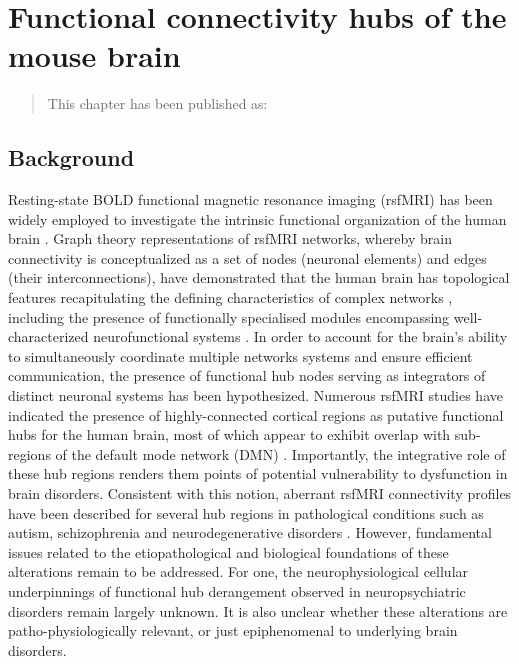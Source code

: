 \chapter{Functional connectivity hubs of the mouse brain}

\label{Chapter02}

\begin{quote}
    This chapter has been published as:

\end{quote}

\section{Background} 
Resting-state BOLD functional magnetic resonance imaging (rsfMRI) has been
widely employed to investigate the intrinsic functional organization of the
human brain \parencite{bullmore2009}. Graph theory representations of rsfMRI
networks, whereby brain connectivity is conceptualized as a set of nodes
(neuronal elements) and edges (their interconnections), have demonstrated that
the human brain has topological features recapitulating the defining
characteristics of complex networks \parencite{watts1998}, including the
presence of functionally specialised modules encompassing well-characterized
neurofunctional systems \parencite{fair2009, meunier2009, power2011}. In order
to account for the brain’s ability to simultaneously coordinate multiple
networks systems and ensure efficient communication, the presence of functional
hub nodes serving as integrators of distinct neuronal systems has been
hypothesized. Numerous rsfMRI studies have indicated the presence of
highly-connected cortical regions as putative functional hubs for the human
brain, most of which appear to exhibit overlap with sub-regions of the default
mode network (DMN) \parencite{cole2010, tomasi2011, zuo2012}. Importantly, the
integrative role of these hub regions renders them points of potential
vulnerability to dysfunction in brain disorders. Consistent with this notion,
aberrant rsfMRI connectivity profiles have been described for several hub
regions in pathological conditions such as autism, schizophrenia and
neurodegenerative disorders \parencite{buckner2009, vandenheuvel2013}. However,
fundamental issues related to the etiopathological and biological foundations of
these alterations remain to be addressed. For one, the neurophysiological
cellular underpinnings of functional hub derangement observed in
neuropsychiatric disorders remain largely unknown.  It is also unclear whether
these alterations are patho-physiologically relevant, or just epiphenomenal to
underlying brain disorders.

